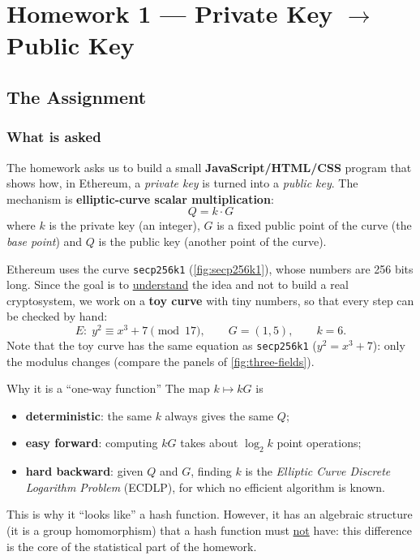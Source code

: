 
\chapter{Homework 1 --- Private Key $\to$ Public Key}
\label{ch:hw1}

\section{The Assignment}


\subsection{What is asked}

The homework asks us to build a small \textbf{JavaScript/HTML/CSS} program that shows how, in Ethereum, a \textit{private key} is turned into a \textit{public key}. The mechanism is \textbf{elliptic-curve scalar multiplication}:
\[
  Q = k \cdot G
\]
where $k$ is the private key (an integer), $G$ is a fixed public point of the curve (the \textit{base point}) and $Q$ is the public key (another point of the curve).

Ethereum uses the curve \texttt{secp256k1} (\cref{fig:secp256k1}), whose numbers are 256 bits long. Since the goal is to \underline{understand} the idea and not to build a real cryptosystem, we work on a \textbf{toy curve} with tiny numbers, so that every step can be checked by hand:
\[
  E:\; y^2 \equiv x^3 + 7 \pmod{17}, \qquad G = (1,5), \qquad k = 6.
\]
Note that the toy curve has the same equation as \texttt{secp256k1} ($y^2 = x^3 + 7$): only the modulus changes (compare the panels of \cref{fig:three-fields}).

\begin{framedobs}{Why it is a ``one-way function''}
  The map $k \mapsto kG$ is
  \begin{itemize}
    \item \textbf{deterministic}: the same $k$ always gives the same $Q$;
    \item \textbf{easy forward}: computing $kG$ takes about $\log_2 k$ point operations;
    \item \textbf{hard backward}: given $Q$ and $G$, finding $k$ is the \textit{Elliptic Curve Discrete Logarithm Problem} (ECDLP), for which no efficient algorithm is known.
  \end{itemize}
  This is why it ``looks like'' a hash function. However, it has an algebraic structure (it is a group homomorphism) that a hash function must \underline{not} have: this difference is the core of the statistical part of the homework.
\end{framedobs}

